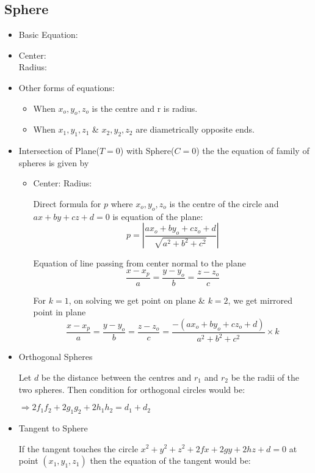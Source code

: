 \documentclass[12pt]{article}
\begin{document}
\subsection{Sphere}
\begin{itemize}
\item Basic Equation: 
\item Center:  \vspace{0.1cm} \\
      Radius: 
\item Other forms of equations:
\begin{itemize}
    \item When $x_o,y_o,z_o$ is the centre and r is radius. \\

    \item When $x_1,y_1,z_1$ \& $x_2,y_2,z_2$ are diametrically opposite ends. \\
\end{itemize}
\item Intersection of Plane($T=0$) with Sphere($C=0$) the the equation of family of spheres is given by 
\begin{itemize}
    \item Center: \quad
          Radius: 
    \begin{notes}
    Direct formula for $p$ where $x_o,y_o,z_o$ is the centre of the circle and $ax+by+cz+d=0$ is equation of the plane:
    $$p = \left|\frac{ax_o+by_o+cz_o+d}{\sqrt{a^2+b^2+c^2}}\right| $$

    Equation of line passing from center normal to the plane
    $$\frac{x-x_p}{a}=\frac{y-y_o}{b}=\frac{z-z_o}{c}$$
    
    For $k=1$, on solving we get point on plane \& $k=2$, we get mirrored point in plane
    $$\frac{x-x_p}{a}=\frac{y-y_o}{b}=\frac{z-z_o}{c} = \frac{-(ax_o+by_o+cz_o+d)}{a^2+b^2+c^2}\times k$$
    \end{notes}
\end{itemize}
\item Orthogonal Spheres

Let $d$ be the distance between the centres and $r_1$ and $r_2$ be the radii of the two spheres. Then condition for orthogonal circles would be:
\begin{center}
$\Rightarrow 2f_1f_2+2g_1g_2+2h_1h_2=d_1+d_2$
\end{center}

\item Tangent to Sphere

If the tangent touches the circle $x^2+y^2+z^2+2fx+2gy+2hz+d=0$ at point $(x_1,y_1,z_1)$ then the equation of the tangent would be:

\begin{center}
\end{center}
\end{itemize}
\end{document}
